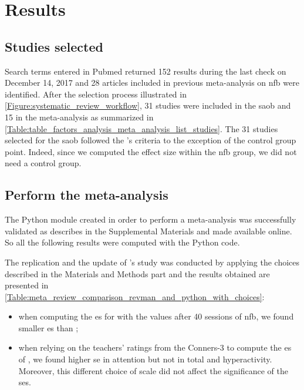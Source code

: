 


\section{Results}

\subsection{Studies selected}

Search terms entered in Pubmed returned 152 results during the last check on December 14, 2017 and 28 articles included in previous
meta-analysis on \gls{nfb} were identified. After the selection process illustrated in \ref{Figure:systematic_review_workflow}, 
31 studies were included in the \gls{saob} and 15 in the meta-analysis as summarized in \ref{Table:table_factors_analysis_meta_analysis_list_studies}.
The 31 studies selected for the \gls{saob} followed the \citeauthor{Cortese2016}'s criteria to the exception of the control group point. 
Indeed, since we computed the effect size within the \gls{nfb} group, we did not need a control group.

\subsection{Perform the meta-analysis}

The Python module created in order to perform a meta-analysis was successfully validated as describes in the Supplemental Materials and made available online.
So all the following results were computed with the Python code. 

The replication and the update of \citeauthor{Cortese2016}'s study was conducted by applying the choices described in the Materials and Methods part 
and the results obtained are presented in \ref{Table:meta_review_comparison_revman_and_python_with_choices}:

\begin{itemize}
    \item when computing the \gls{es} for \citet{Arnold2014} with the values after 40 sessions of \gls{nfb}, we found smaller \gls{es} than \citet{Cortese2016};  
    \item when relying on the teachers' ratings from the Conners-3 to compute the \gls{es} of \citet{Steiner2014}, we found higher \gls{se} in attention but not 
		in total and hyperactivity. Moreover, this different choice of scale did not affect the significance of the \glspl{se}.
\end{itemize}

